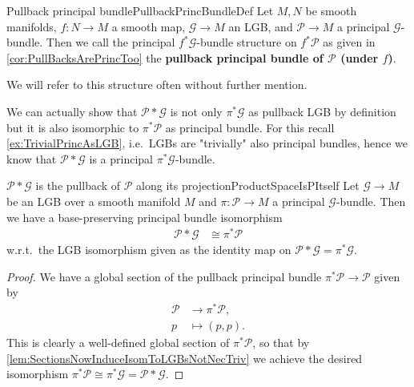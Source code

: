 \documentclass[reqno,a4paper,oneside]{amsart}
\theoremstyle{plain}
\theoremstyle{remark}
\theoremstyle{definition}
\begin{document}
\begin{definitions}{Pullback principal bundle}{PullbackPrincBundleDef}
Let $M, N$ be smooth manifolds, $f: N \to M$ a smooth map, $\mathcal{G} \to M$ an LGB, and $\mathcal{P} \to M$ a principal $\mathcal{G}$-bundle. Then we call the principal $f^*\mathcal{G}$-bundle structure on $f^*\mathcal{P}$ as given in \ref{cor:PullBacksArePrincToo} the \textbf{pullback principal bundle of $\mathcal{P}$ (under $f$)}.

We will refer to this structure often without further mention.
\end{definitions}

We can actually show that $\mathcal{P}*\mathcal{G}$ is not only $\pi^*\mathcal{G}$ as pullback LGB by definition but it is also isomorphic to $\pi^*\mathcal{P}$ as principal bundle. For this recall \ref{ex:TrivialPrincAsLGB}, i.e.\ LGBs are "trivially" also principal bundles, hence we know that $\mathcal{P} * \mathcal{G}$ is a principal $\pi^*\mathcal{G}$-bundle.

\begin{corollaries}{$\mathcal{P}*\mathcal{G}$ is the pullback of $\mathcal{P}$ along its projection}{ProductSpaceIsPItself}
Let $\mathcal{G} \to M$ be an LGB over a smooth manifold $M$ and $\pi\colon\mathcal{P} \to M$ a principal $\mathcal{G}$-bundle. Then we have a base-preserving principal bundle isomorphism 
\begin{align*}
\mathcal{P}*\mathcal{G} &\cong \pi^*\mathcal{P}
\end{align*}
w.r.t.\ the LGB isomorphism given as the identity map on $\mathcal{P} * \mathcal{G} = \pi^*\mathcal{G}$.
\end{corollaries}

\begin{proof}
\leavevmode\newline
We have a global section of the pullback principal bundle $\pi^*\mathcal{P} \to \mathcal{P}$ given by
\begin{align*}
\mathcal{P} &\to \pi^*\mathcal{P},\\
p &\mapsto (p, p).
\end{align*}
This is clearly a well-defined global section of $\pi^*\mathcal{P}$, so that by \ref{lem:SectionsNowInduceIsomToLGBsNotNecTriv} we achieve the desired isomorphism $\pi^*\mathcal{P} \cong \pi^*\mathcal{G} = \mathcal{P} * \mathcal{G}$.
\end{proof}
\end{document}
